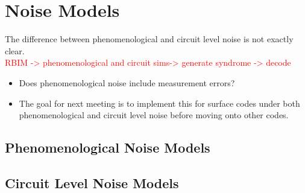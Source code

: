\chapter{Noise Models}\label{ch:noise-models}
The difference between phenomenological and circuit level noise is not exactly clear. \\ 
\textcolor{red}{RBIM -> phenomenological and circuit sims-> generate syndrome -> decode}
\begin{itemize}
    \item Does phenomenological noise include measurement errors?
    \item The goal for next meeting is to implement this for surface codes under both phenomenological and circuit level noise before moving onto other codes.
\end{itemize}
\section{Phenomenological Noise Models}\label{}
\lipsum[1]
\section{Circuit Level Noise Models}
\lipsum[5]

